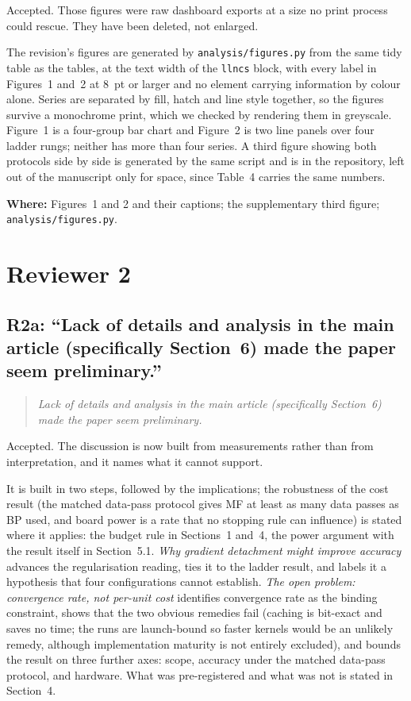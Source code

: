 \documentclass[11pt,a4paper]{article}
\newcommand{\MF}{MF}
\newcommand{\BP}{BP}
\newenvironment{comment}%
  {\begin{quote}\itshape\small}%
  {\end{quote}}
\newcommand{\where}[1]{\par\smallskip\noindent\textbf{Where:} #1\par}
\begin{document}
\noindent
Accepted. Those figures were raw dashboard exports at a size no print process
could rescue. They have been deleted, not enlarged.

The revision's figures are generated by
\texttt{analysis/figures.py} from the same tidy table as the tables, at the
text width of the \texttt{llncs} block, with every label in Figures~1 and~2 at \num{8}~pt or larger and no element carrying information by colour alone. Series are
separated by fill, hatch and line style together, so the figures survive a
monochrome print, which we checked by rendering them in greyscale. Figure~1 is
a four-group bar chart and Figure~2 is two line panels over four ladder rungs;
neither has more than four series. A third figure showing both protocols side
by side is generated by the same script and is in the repository, left out of
the manuscript only for space, since Table~4 carries the same numbers.

\where{Figures~1 and 2 and their captions; the supplementary third figure;
\texttt{analysis/figures.py}.}

\section*{Reviewer 2}

\subsection*{R2a: ``Lack of details and analysis in the main article
(specifically Section~6) made the paper seem preliminary.''}

\begin{comment}
Lack of details and analysis in the main article (specifically Section~6) made
the paper seem preliminary.
\end{comment}

\noindent
Accepted. The discussion is now built from measurements rather than from
interpretation, and it names what it cannot support.

It is built in two steps, followed by the implications; the robustness of
the cost result (the matched data-pass protocol gives \MF{} at least as many
data passes as \BP{} used, and board power is a rate that no stopping rule can
influence) is stated where it applies: the budget rule in Sections~1 and~4,
the power argument with the result itself in Section~5.1. \emph{Why gradient
detachment might improve accuracy} advances the regularisation reading, ties it
to the ladder result, and labels it a hypothesis that four configurations
cannot establish. \emph{The open problem: convergence rate, not per-unit cost}
identifies convergence
rate as the binding constraint, shows that the two obvious remedies fail
(caching is bit-exact and saves no time; the runs are launch-bound so faster
kernels would be an unlikely remedy, although implementation maturity is not
entirely excluded), and bounds the result on three further axes: scope,
accuracy under the matched data-pass protocol, and hardware. What was pre-registered and
what was not is stated in Section~4.
\end{document}

